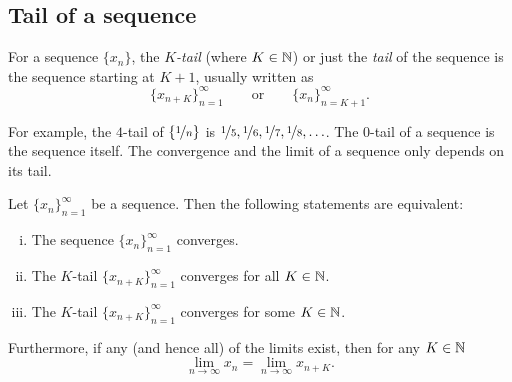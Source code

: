 \subsection{Tail of a sequence}

\begin{defn}
For a sequence $\{ x_n \}$,
the \emph{$K$-tail} (where $K \in {\mathbb{N}}$)
or just the
\emph{tail} of
the sequence is the sequence starting at $K+1$, usually written as
\begin{equation*}
\{ x_{n+K} \}_{n=1}^\infty
\qquad \text{or} \qquad \{ x_n \}_{n=K+1}^\infty .
\end{equation*}
\end{defn}
For example, the $4$-tail of $\{ \nicefrac{1}{n} \}$ is
$\nicefrac{1}{5}, \nicefrac{1}{6}, \nicefrac{1}{7}, \nicefrac{1}{8},
\ldots$.  The $0$-tail of a sequence is the sequence itself.
The convergence and the limit of a sequence only depends on its tail.

\begin{prop}
Let $\{ x_n \}_{n=1}^\infty$ be a sequence.  Then the following
statements are equivalent:
\begin{enumerate}[(i)]
\item \label{prop:ktail:i}
The sequence $\{ x_n \}_{n=1}^\infty$ converges.
\item \label{prop:ktail:ii}
The $K$-tail $\{ x_{n+K} \}_{n=1}^\infty$ converges for all $K \in {\mathbb{N}}$.
\item \label{prop:ktail:iii}
The $K$-tail $\{ x_{n+K} \}_{n=1}^\infty$ converges for some $K \in {\mathbb{N}}$.
\end{enumerate}
Furthermore, if any (and hence all) of the limits exist, then for any $K \in {\mathbb{N}}$
\begin{equation*}
\lim_{n\to \infty} x_n = \lim_{n \to \infty} x_{n+K} .
\end{equation*}
\end{prop}

